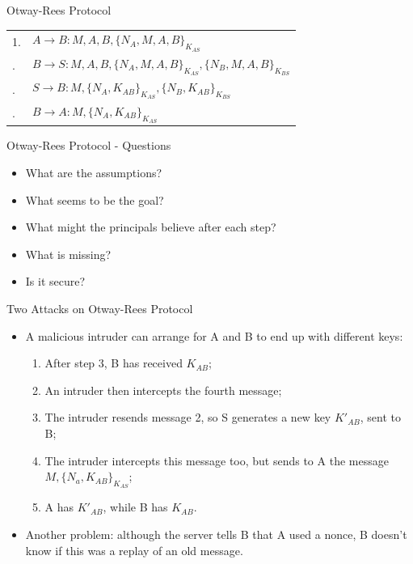 \documentclass[12pt,table,xcolor={dvipsnames}]{beamer}
\begin{document}
\begin{frame}{Otway-Rees Protocol}
\begin{table}[htdp]
\begin{center}
\begin{tabular}{ l l }
1. & $A\rightarrow B:M,A,B,\{N_{A},M,A,B\}_{K_{AS}}$ \\\pause
2. & $B\rightarrow S:M,A,B,\{N_{A},M,A,B\}_{{K_{{AS}}}},\{N_{B},M,A,B\}_{{K_{{BS}}}}$ \\\pause
3. & $S\rightarrow B:M,\{N_{A},K_{{AB}}\}_{{K_{{AS}}}},\{N_{B},K_{{AB}}\}_{{K_{{BS}}}}$ \\\pause
4. & $B\rightarrow A:M,\{N_{A},K_{{AB}}\}_{{K_{{AS}}}}$ 
\end{tabular}
\end{center}
\end{table}%
\end{frame}

\begin{frame}{Otway-Rees Protocol - Questions}
\begin{itemize}
\item What are the assumptions? \pause
\item What seems to be the goal?\pause 
\item What might the principals believe after each step?\pause
\item What is missing?\pause
\item Is it secure?
\end{itemize}
\end{frame}

\begin{frame}{Two Attacks on Otway-Rees Protocol}
\begin{itemize}
\item A malicious intruder can arrange for A and B to end up with
different keys:\pause
\begin{enumerate}
\item After step 3, B has received $K_{AB}$;\pause
\item An intruder then intercepts the fourth message;\pause
\item The intruder resends message 2, so S generates a new key $K'_{AB}$, sent to B;\pause
\item The intruder intercepts this message too, but sends to A the message $M,\{N_a,K_{AB}\}_{K_{AS}}$;\pause
\item A has $K'_{AB}$, while B has $K_{AB}$. \pause
\end{enumerate}
\item Another problem: although the server tells B that A used a nonce, B doesn’t know if this was a replay of an old message.
\end{itemize}
\end{frame}
\end{document}
